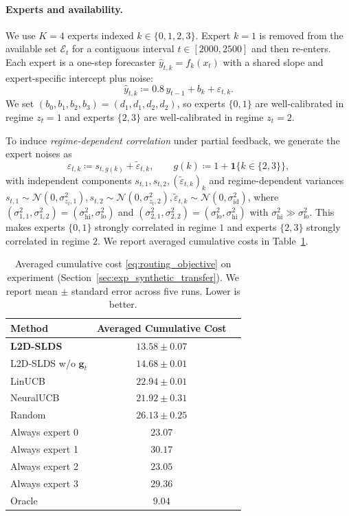 \paragraph{Experts and availability.}
We use \(K=4\) experts indexed \(k\in\{0,1,2,3\}\). Expert \(k=1\) is removed from the available set \(\mathcal{E}_t\)
for a contiguous interval \(t\in[2000,2500]\) and then re-enters. Each expert is a one-step forecaster
\(\hat y_{t,k}=f_k(x_t)\) with a shared slope and expert-specific intercept plus noise:
\begin{equation}
\label{eq:exp_synth_expert_rule_appendix}
\hat y_{t,k} \coloneqq 0.8\,y_{t-1} + b_k + \varepsilon_{t,k}.
\end{equation}
We set \((b_0,b_1,b_2,b_3)=(d_1,d_1,d_2,d_2)\), so experts \(\{0,1\}\) are well-calibrated in regime
\(z_t=1\) and experts \(\{2,3\}\) are well-calibrated in regime \(z_t=2\).

To induce \emph{regime-dependent correlation} under partial feedback, we generate the expert noises as
\[
\varepsilon_{t,k} \coloneqq s_{t,g(k)} + \tilde\varepsilon_{t,k},
\qquad
g(k)\coloneqq 1+\mathbf{1}\{k\in\{2,3\}\},
\]
with independent components \(s_{t,1},s_{t,2},(\tilde\varepsilon_{t,k})_{k}\) and regime-dependent
variances $s_{t,1}\sim\mathcal{N}(0,\sigma_{z_t,1}^2), s_{t,2}\sim\mathcal{N}(0,\sigma_{z_t,2}^2),
\tilde\varepsilon_{t,k}\sim\mathcal{N}(0,\sigma_{\mathrm{id}}^2)$, where \((\sigma_{1,1}^2,\sigma_{1,2}^2)=(\sigma_{\mathrm{hi}}^2,\sigma_{\mathrm{lo}}^2)\) and
\((\sigma_{2,1}^2,\sigma_{2,2}^2)=(\sigma_{\mathrm{lo}}^2,\sigma_{\mathrm{hi}}^2)\) with
\(\sigma_{\mathrm{hi}}^2\gg\sigma_{\mathrm{lo}}^2\). This makes experts \(\{0,1\}\) strongly
correlated in regime \(1\) and experts \(\{2,3\}\) strongly correlated in regime \(2\). We report
averaged cumulative costs in Table~\ref{tab:exp_avg_costs_appendix}.


\begin{table}[ht]
\centering
\small
\setlength{\tabcolsep}{4pt}
\caption{Averaged cumulative cost \eqref{eq:routing_objective} on experiment (Section~\ref{sec:exp_synthetic_transfer}).
We report mean \(\pm\) standard error across five runs. Lower is better.}
\label{tab:exp_avg_costs_appendix}
\begin{tabular}{@{}lcc@{}}
\toprule
Method & Averaged Cumulative Cost \\
\midrule
\textbf{L2D-SLDS} & \(\mathbf{13.58 \pm 0.07}\)  \\
L2D-SLDS w/o \(\mathbf{g}_t\) & \(14.68 \pm 0.01\)  \\
\midrule
LinUCB & \(22.94 \pm 0.01\)  \\
NeuralUCB & \(21.92 \pm 0.31\)  \\
Random & \(26.13 \pm 0.25\)   \\
Always expert 0 & \(23.07\)  \\
Always expert 1 & \(30.17\)  \\
Always expert 2 & \(23.05\)  \\
Always expert 3 & \(29.36\)  \\
Oracle & \(9.04\)\\
\bottomrule
\end{tabular}
\end{table}

